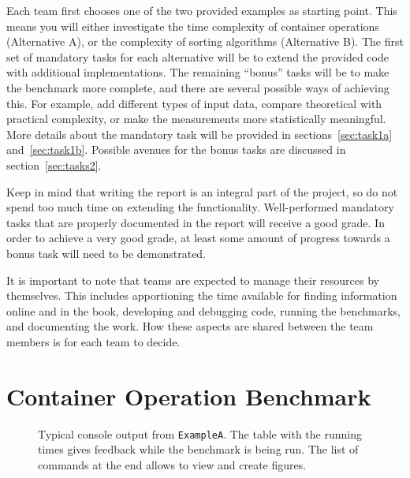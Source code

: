 \documentclass[a4paper,10pt]{article}
\begin{document}
Each team first chooses one of the two provided examples as starting point.
This means you will either investigate the time complexity of container operations (Alternative A), or the complexity of sorting algorithms (Alternative B).
The first set of mandatory tasks for each alternative will be to extend the provided code with additional implementations.
The remaining ``bonus'' tasks will be to make the benchmark more complete, and there are several possible ways of achieving this.
For example, add different types of input data, compare theoretical with practical complexity, or make the measurements more statistically meaningful.
More details about the mandatory task will be provided in sections~\ref{sec:task1a} and~\ref{sec:task1b}.
Possible avenues for the bonus tasks are discussed in section~\ref{sec:tasks2}.

Keep in mind that writing the report is an integral part of the project, so do not spend too much time on extending the functionality.
Well-performed mandatory tasks that are properly documented in the report will receive a good grade.
In order to achieve a very good grade, at least some amount of progress towards a bonus task will need to be demonstrated.

It is important to note that teams are expected to manage their resources by themselves.
This includes apportioning the time available for finding information online and in the book, developing and debugging code, running the benchmarks, and documenting the work.
How these aspects are shared between the team members is for each team to decide.



\section{Container Operation Benchmark}

\begin{figure}
  \centering
  \caption{
    Typical console output from \texttt{ExampleA}.
    The table with the running times gives feedback while the benchmark is being run.
    The list of commands at the end allows to view and create figures.
  }\label{fig:exa-console}
\end{figure}
  
\end{document}

